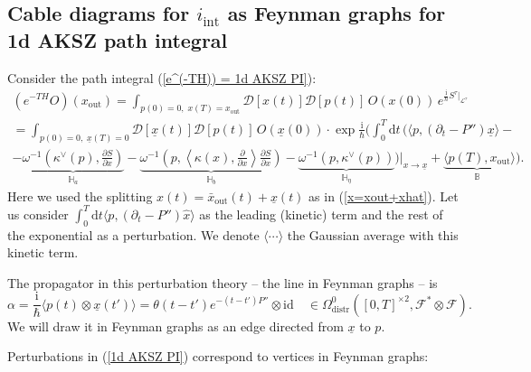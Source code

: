\documentclass{amsart}
\theoremstyle{plain} %
\theoremstyle{definition}
\theoremstyle{remark}
\newcommand{\mc}{\mathcal}
\newcommand{\mr}{\mathrm}
\newcommand{\ra}{\rightarrow}
\newcommand{\wh}{\widehat}
\newcommand{\F}{\mathcal{F}}
\newcommand{\LL}{\mathcal{L}}
\newcommand{\dd}{\partial}
\newcommand{\ii}{\mathrm{int}}
\newcommand{\iii}{\mathrm{i}}
\newcommand{\xx}{\underline{x}}
\newcommand{\dr}{\mathrm{d}}
\begin{document}
\subsection{Cable diagrams for $i_\ii$ as Feynman graphs for 1d AKSZ path integral} \label{sss: cable diagrams for i_int via 1d AKSZ}

Consider the path integral (\ref{e^(-TH)) = 1d AKSZ PI}):
\begin{multline}\label{1d AKSZ PI}
    (e^{-TH}O)(x_\mr{out})=
           \int_{p(0)=0,\; x(T)=x_\mr{out}} \mc{D} [x(t)] \mc{D} [p(t)]\, O(x(0)) \, e^{\frac{\iii}{\hbar}S^\tau|_{\LL^\tau}}\\
           = \int_{p(0)=0,\; \xx(T)=0}
           \mc{D} [\xx(t)] \mc{D}[p(t)] \, O(\xx(0))\cdot \exp\frac{\iii}{\hbar}\Big(
           \int_0^T \dr t\, \Big(
           \langle p,(\dd_t-P'')\xx\rangle -\\
           -\underbrace{\omega^{-1}\left(\kappa^\vee(p),\frac{\dd S}{\dd x}\right)}_{\mathbb{H}_a} -
           \underbrace{\omega^{-1}\left( p, \left\langle \kappa(x),\frac{\dd}{\dd x} \right\rangle \frac{\dd S}{\dd x}\right)}_{\mathbb{H}_b}
           -\underbrace{\omega^{-1}(p,\kappa^\vee(p))}_{\mathbb{H}_\eta}
           \Big)\Big|_{x\ra \xx}
           +\underbrace{\langle p(T),x_\mr{out}}_{\mathbb{B}} \rangle
           \Big).
\end{multline}
Here we used the splitting  $x(t)=\bar{x}_\mr{out}(t)+\xx(t)$ as in (\ref{x=xout+xhat}). Let us consider $\int_0^T \dr t\langle p,(\dd_t-P'')\wh{x} \rangle$ as the leading (kinetic) term and the rest of the exponential as a perturbation. We denote $\langle \cdots \rangle$ the Gaussian average with this kinetic term.

The propagator in this perturbation theory -- the line in Feynman graphs -- is
\begin{equation}\label{1d AKSZ propagator alpha}
    \alpha= \frac{\iii}{\hbar}\langle p(t)\otimes \xx(t')  \rangle = 
    \theta(t-t') e^{-(t-t')P''}\otimes \mr{id} \quad \in \Omega^0_\mr{distr}([0,T]^{\times 2},\F^*\otimes \F).
\end{equation}
We will draw it in Feynman graphs as an edge directed from $\xx$ to $p$.

Perturbations in (\ref{1d AKSZ PI}) correspond to vertices in Feynman graphs:
\end{document}
